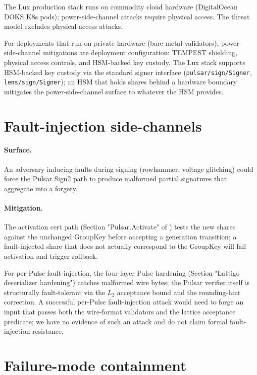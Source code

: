 \documentclass[11pt,a4paper]{article}
\begin{document}
The Lux production stack runs on commodity cloud hardware (DigitalOcean DOKS K8s pods); power-side-channel attacks require physical access. The threat model excludes physical-access attacks.

For deployments that run on private hardware (bare-metal validators), power-side-channel mitigations are deployment configuration: TEMPEST shielding, physical access controls, and HSM-backed key custody. The Lux stack supports HSM-backed key custody via the standard signer interface (\texttt{pulsar/sign/Signer}, \texttt{lens/sign/Signer}); an HSM that holds shares behind a hardware boundary mitigates the power-side-channel surface to whatever the HSM provides.

\section{Fault-injection side-channels}

\paragraph{Surface.} An adversary inducing faults during signing (rowhammer, voltage glitching) could force the Pulsar Sign2 path to produce malformed partial signatures that aggregate into a forgery.

\paragraph{Mitigation.} The activation cert path (Section "Pulsar.Activate" of \cite{luxpulsar}) tests the new shares against the unchanged GroupKey before accepting a generation transition; a fault-injected share that does not actually correspond to the GroupKey will fail activation and trigger rollback.

For per-Pulse fault-injection, the four-layer Pulse hardening (Section "Lattigo deserializer hardening") catches malformed wire bytes; the Pulsar verifier itself is structurally fault-tolerant via the $L_2$ acceptance bound and the rounding-hint correction. A successful per-Pulse fault-injection attack would need to forge an input that passes both the wire-format validators and the lattice acceptance predicate; we have no evidence of such an attack and do not claim formal fault-injection resistance.

\section{Failure-mode containment}
\end{document}
